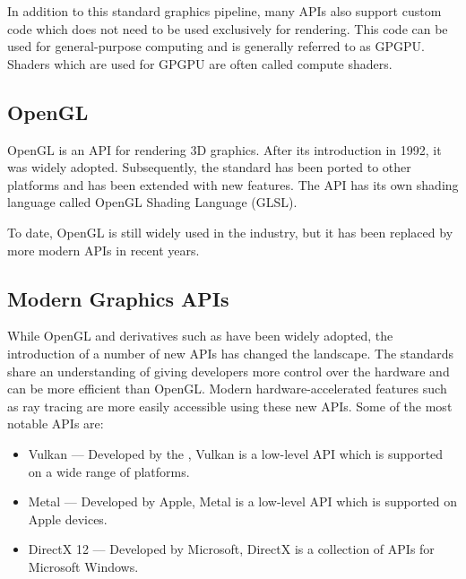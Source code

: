 In addition to this standard graphics pipeline, many \glspl{API} also support custom code which does not need to be used exclusively for rendering. This code can be used for general-purpose computing and is generally referred to as \gls{GPGPU}. Shaders which are used for \gls{GPGPU} are often called compute shaders.

\subsection{OpenGL}

\gls{OpenGL} is an \gls{API} for rendering 3D graphics. After its introduction in 1992, it was widely adopted. Subsequently, the standard has been ported to other platforms and has been extended with new features. The \gls{API} has its own shading language called OpenGL Shading Language (\gls{GLSL}).

To date, \gls{OpenGL} is still widely used in the industry, but it has been replaced by more modern \glspl{API} in recent years.

\subsection{Modern Graphics APIs}

While \gls{OpenGL} and derivatives such as  have been widely adopted, the introduction of a number of new \glspl{API} has changed the landscape. The standards share an understanding of giving developers more control over the hardware and can be more efficient than \gls{OpenGL}. Modern hardware-accelerated features such as ray tracing are more easily accessible using these new \glspl{API}. Some of the most notable \glspl{API} are:

\begin{itemize}
    \item{\gls{Vulkan}} — Developed by the , Vulkan is a low-level \gls{API} which is supported on a wide range of platforms.
    \item{\gls{Metal}} — Developed by Apple, Metal is a low-level \gls{API} which is supported on Apple devices.
    \item{\gls{DirectX 12}} — Developed by Microsoft, DirectX is a collection of \glspl{API} for Microsoft Windows.
\end{itemize}


